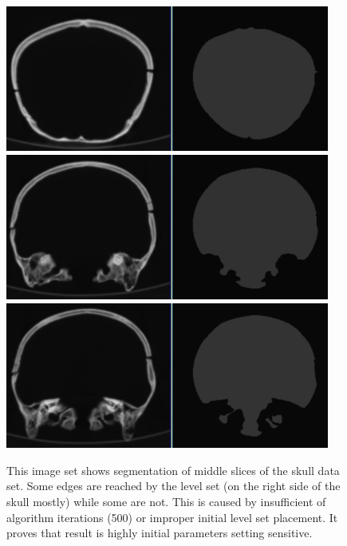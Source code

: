 \begin{figure}
    \centering
    \includegraphics[width=0.95\textwidth]{data/png/12}
    \includegraphics[width=0.95\textwidth]{data/png/17}
    \includegraphics[width=0.95\textwidth]{data/png/18}
    \caption[Result of segmentation middle slices of the skull data set]
{
This image set shows segmentation of middle slices of the skull data set.
Some edges are reached by the level set (on the right side of the skull mostly) while some are not.
This is caused by insufficient of algorithm iterations (500) or improper initial level set placement.
It proves that result is highly initial parameters setting sensitive.
}
    \label{fg:middleSlicesSegmentation}
\end{figure}


